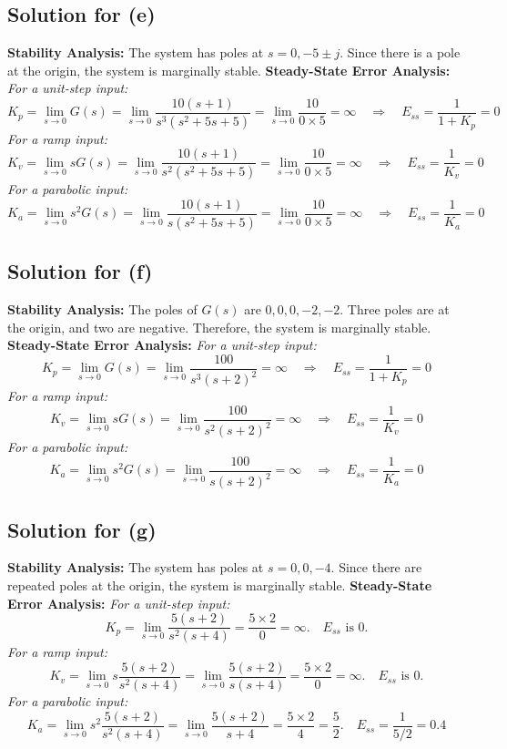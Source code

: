 \documentclass[11pt]{article}
\begin{document}
\subsection*{Solution for (e)}

\textbf{Stability Analysis:}
The system has poles at \(s = 0, -5 \pm j\). Since there is a pole at the origin, the system is marginally stable.
\newline
\textbf{Steady-State Error Analysis:}
\newline
\textit{For a unit-step input:}
\[
K_p = \lim_{{s \to 0}} G(s) = \lim_{{s \to 0}} \frac{10(s+1)}{s^3(s^2 + 5s + 5)} = \lim_{{s \to 0}} \frac{10}{0 \times 5} = \infty \quad \Rightarrow \quad E_{ss} = \frac{1}{1+K_p} = 0
\]
\textit{For a ramp input:}
\[
K_v = \lim_{{s \to 0}} sG(s) = \lim_{{s \to 0}} \frac{10(s+1)}{s^2(s^2 + 5s + 5)} = \lim_{{s \to 0}} \frac{10}{0 \times 5} = \infty \quad \Rightarrow \quad E_{ss} = \frac{1}{K_v} = 0
\]
\textit{For a parabolic input:}
\[
K_a = \lim_{{s \to 0}} s^2G(s) = \lim_{{s \to 0}} \frac{10(s+1)}{s(s^2 + 5s + 5)} = \lim_{{s \to 0}} \frac{10}{0 \times 5} = \infty \quad \Rightarrow \quad E_{ss} = \frac{1}{K_a} = 0
\]
\newpage
\subsection*{Solution for (f)}

\textbf{Stability Analysis:}
The poles of \(G(s)\) are \(0, 0, 0, -2, -2\). Three poles are at the origin, and two are negative. Therefore, the system is marginally stable.
\newline
\textbf{Steady-State Error Analysis:}
\newline
\textit{For a unit-step input:}
\[
K_p = \lim_{{s \to 0}} G(s) = \lim_{{s \to 0}} \frac{100}{s^3(s+2)^2} = \infty \quad \Rightarrow \quad E_{ss} = \frac{1}{1+K_p} = 0
\]
\textit{For a ramp input:}
\[
K_v = \lim_{{s \to 0}} sG(s) = \lim_{{s \to 0}} \frac{100}{s^2(s+2)^2} = \infty \quad \Rightarrow \quad E_{ss} = \frac{1}{K_v} = 0
\]
\textit{For a parabolic input:}
\[
K_a = \lim_{{s \to 0}} s^2G(s) = \lim_{{s \to 0}} \frac{100}{s(s+2)^2} = \infty \quad \Rightarrow \quad E_{ss} = \frac{1}{K_a} = 0
\]

\subsection*{Solution for (g)}

\textbf{Stability Analysis:}
The system has poles at \(s = 0, 0, -4\). Since there are repeated poles at the origin, the system is marginally stable.
\newline
\textbf{Steady-State Error Analysis:}
\newline
\textit{For a unit-step input:}
\[
K_p = \lim_{{s \to 0}} \frac{5(s+2)}{s^2(s+4)} = \frac{5 \times 2}{0} = \infty. \quad E_{ss} \text{ is 0.}
\]
\textit{For a ramp input:}
\[
K_v = \lim_{{s \to 0}} s \frac{5(s+2)}{s^2(s+4)} = \lim_{{s \to 0}} \frac{5(s+2)}{s(s+4)} = \frac{5 \times 2}{0} = \infty. \quad E_{ss} \text{ is 0.}
\]
\textit{For a parabolic input:}
\[
K_a = \lim_{{s \to 0}} s^2 \frac{5(s+2)}{s^2(s+4)} = \lim_{{s \to 0}} \frac{5(s+2)}{s+4} = \frac{5 \times 2}{4} = \frac{5}{2}. \quad E_{ss} = \frac{1}{5/2} = 0.4
\]
\newpage
\end{document}
